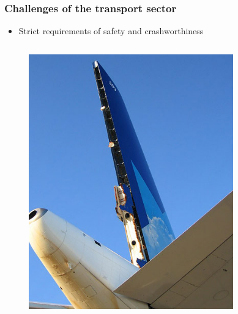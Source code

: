 \documentclass[first,firstsupp,lastsupp,last,hyperref,table]{ETHclass}
\begin{document}
\addtocounter{framenumber}{-1}

\begin{frame}
\frametitle{Challenges of the transport sector}
\vspace{-0.25cm}
\centering
\begin{itemize}[label=]
\item Strict requirements of safety and crashworthiness
\end{itemize}
\vspace{-0.2cm}
\begin{columns}[c]
\begin{column}{0.5\textwidth}
\centering
\begin{figure}
\centering
\includegraphics[width=0.8\columnwidth]{A310-308.jpg}
\end{figure}
\end{column}
\begin{column}{0.5\textwidth}
\centering
\begin{figure}
\centering

\end{figure}
\end{column}
\end{columns}
\end{frame}
\end{document}
